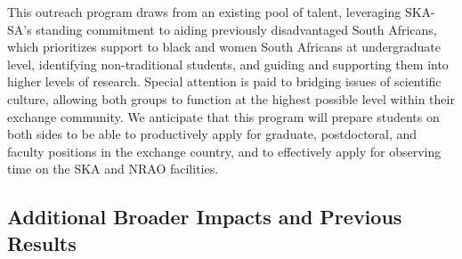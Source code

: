 \documentclass[preprint]{aastex}
\newcommand{\compress}{\vspace{-0.3in}}
\begin{document}
This outreach program draws from an existing pool of talent, 
leveraging SKA-SA's standing commitment to aiding previously disadvantaged South Africans,
which prioritizes support to black and women South Africans at undergraduate level,
identifying non-traditional students, and guiding and supporting them into
higher levels of research.  
Special attention is paid to bridging issues of
scientific culture, allowing both groups to function at the highest possible
level within their exchange community.  We anticipate that this program will
prepare students on both sides to be able to productively apply for graduate,
postdoctoral, and faculty positions in the exchange country, and to effectively
apply for observing time on the SKA and NRAO facilities.  

\compress
\subsection{Additional Broader Impacts and Previous Results}
\label{sec:other_broader}

\end{document}
